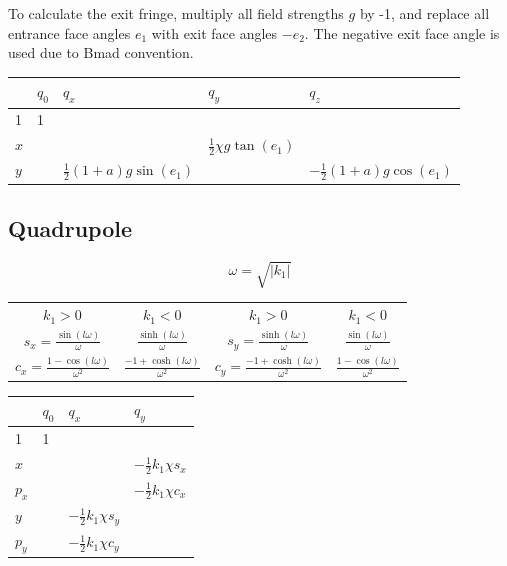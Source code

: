 To calculate the exit fringe, multiply all field strengths $g$ by
-1, and replace all entrance face angles $e_1$ with exit face angles $-e_2$. The negative exit face
angle is used due to Bmad convention.
\begin{center}
  \begin{tabular}{lllll} \toprule
      & $q_0$ & $q_x$                         & $q_y$                          & $q_z$ \\ \midrule
  1   & 1     &                               &                                & \\ \addlinespace[1ex]
  $x$ &       &                               & $\frac{1}{2} \chi g \tan(e_1)$ & \\ \addlinespace[1ex]
  $y$ &       & $\frac{1}{2}(1+a)g \sin(e_1)$ &                                & $-\frac{1}{2}(1+a)g \cos(e_1)$ \\
  \bottomrule
  \end{tabular}
\end{center}

\subsection{Quadrupole}

\begin{equation}
  \omega = \sqrt{|k_1|} \nonumber
\end{equation}

\begin{center}
\begin{tabular}{cccc}
  $k_1 > 0$ & $k_1 < 0$ & $k_1 > 0$ & $k_1 < 0$  \\
  $s_x = \frac{\sin{(l \omega)}}{\omega}$ & $ \frac{\sinh{(l \omega)}}{\omega}$ &$s_y = \frac{\sinh{(l \omega)}}{\omega}$ & $ \frac{\sin{(l \omega)}}{\omega}$ \\
  $c_x = \frac{1 - \cos{(l \omega)}}{\omega^2}$ & $ \frac{-1 + \cosh{(l \omega)}}{\omega^2}$ &$c_y = \frac{-1 + \cosh{(l \omega)}}{\omega^2}$ & $ \frac{1 - \cos{(l \omega)}}{\omega^2}$ \\
\end{tabular}
\end{center}
\everymath{}

\begin{center}
\begin{tabular}{llll} \toprule
        & $q_0$ & $q_x$ & $q_y$ \\ \midrule
  1     & 1     &       &       \\ \addlinespace[1ex]
  $x$   &       &       & $-\frac{1}{2} k_1 \chi s_x$ \\ \addlinespace[1ex]
  $p_x$ &       &       & $-\frac{1}{2} k_1 \chi c_x$ \\ \addlinespace[1ex]
  $y$   &       & $-\frac{1}{2} k_1 \chi s_y$ & \\ \addlinespace[1ex]
  $p_y$ &       & $-\frac{1}{2} k_1 \chi c_y$ & \\
\bottomrule
\end{tabular}
\end{center}

